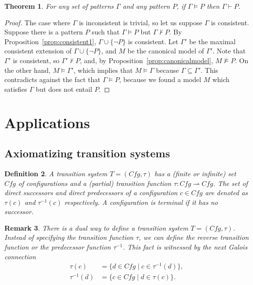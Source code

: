 \documentclass{article}
\theoremstyle{plain}
\newtheorem{thm}{Theorem}
\newtheorem{defn}[thm]{Definition}
\newtheorem{rmk}[thm]{Remark}
\def\Cfg{\textit{Cfg}}
\begin{document}
\begin{thm}
For any set of patterns $\Gamma$ and any pattern $P$, if $\Gamma \vDash P$ then $\Gamma \vdash P$.
\end{thm}
\begin{proof}
The case where $\Gamma$ is inconsistent is trivial, so let us suppose $\Gamma$ is consistent. Suppose there is a pattern $P$ such that $\Gamma \vDash P$ but $\Gamma \not \vdash P$. By Proposition~\ref{prop:consistent1}, $\Gamma \cup \{\neg P\}$ is consistent. Let $\Gamma'$ be the maximal consistent extension of $\Gamma \cup \{\neg P\}$, and $M$ be the canonical model of $\Gamma'$. Note that $\Gamma'$ is consistent, so $\Gamma' \not \vdash P$, and, by Proposition~\ref{prop:canonicalmodel}, $M \not \vDash P$. On the other hand, $M \vDash \Gamma'$, which implies that $M \vDash \Gamma$ because $\Gamma \subseteq \Gamma'$. This contradicts against the fact that $\Gamma \vDash P$, because we found a model $M$ which satisfies $\Gamma$ but does not entail $P$.
\end{proof}



\section{Applications}

\subsection{Axiomatizing transition systems}

\begin{defn}
	A transition system $T = (\Cfg, \tau)$ has a (finite or infinite) set $\Cfg$ of configurations and a (partial) transition function $\tau : \Cfg \rightharpoonup \Cfg$. The set of \emph{direct successors} and \emph{direct predecessors} of a configuration $c \in \Cfg$ are denoted as $\tau(c)$ and $\tau^{-1}(c)$ respectively. A configuration is \emph{terminal} if it has no successor.
\end{defn}

\begin{rmk}
	There is a dual way to define a transition system $T = (\Cfg, \tau)$. Instead of specifying the transition function $\tau$, we can define the \emph{reverse transition function} or the \emph{predecessor function} $\tau^{-1}$. This fact is witnessed by the next Galois connection
	\begin{align*}
	\tau(c)      &= \{d \in \Cfg \mid c \in \tau^{-1}(d) \}, \\
	\tau^{-1}(d) &= \{c \in \Cfg \mid d \in \tau(c) \}.
	\end{align*}
\end{rmk}
\end{document}
